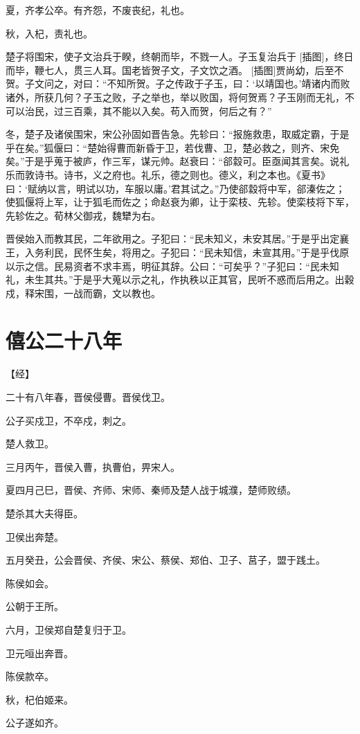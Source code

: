 \documentclass[a4paper,12pt,UTF8,twoside]{ctexbook}
\begin{document}
夏，齐孝公卒。有齐怨，不废丧纪，礼也。

秋，入杞，责礼也。

楚子将围宋，使子文治兵于睽，终朝而毕，不戮一人。子玉复治兵于 [插图]，终日而毕，鞭七人，贯三人耳。国老皆贺子文，子文饮之酒。 [插图]贾尚幼，后至不贺。子文问之，对曰：“不知所贺。子之传政于子玉，曰：‘以靖国也。’靖诸内而败诸外，所获几何？子玉之败，子之举也，举以败国，将何贺焉？子玉刚而无礼，不可以治民，过三百乘，其不能以入矣。苟入而贺，何后之有？”

冬，楚子及诸侯围宋，宋公孙固如晋告急。先轸曰：“报施救患，取威定霸，于是乎在矣。”狐偃曰：“楚始得曹而新昏于卫，若伐曹、卫，楚必救之，则齐、宋免矣。”于是乎蒐于被庐，作三军，谋元帅。赵衰曰：“郤縠可。臣亟闻其言矣。说礼乐而敦诗书。诗书，义之府也。礼乐，德之则也。德义，利之本也。《夏书》曰：‘赋纳以言，明试以功，车服以庸。’君其试之。”乃使郤縠将中军，郤溱佐之；使狐偃将上军，让于狐毛而佐之；命赵衰为卿，让于栾枝、先轸。使栾枝将下军，先轸佐之。荀林父御戎，魏犫为右。

晋侯始入而教其民，二年欲用之。子犯曰：“民未知义，未安其居。”于是乎出定襄王，入务利民，民怀生矣，将用之。子犯曰：“民未知信，未宣其用。”于是乎伐原以示之信。民易资者不求丰焉，明征其辞。公曰：“可矣乎？”子犯曰：“民未知礼，未生其共。”于是乎大蒐以示之礼，作执秩以正其官，民听不惑而后用之。出穀戍，释宋围，一战而霸，文以教也。

\section{僖公二十八年}


【经】

二十有八年春，晋侯侵曹。晋侯伐卫。

公子买戍卫，不卒戍，刺之。

楚人救卫。

三月丙午，晋侯入曹，执曹伯，畀宋人。

夏四月己巳，晋侯、齐师、宋师、秦师及楚人战于城濮，楚师败绩。

楚杀其大夫得臣。

卫侯出奔楚。

五月癸丑，公会晋侯、齐侯、宋公、蔡侯、郑伯、卫子、莒子，盟于践土。

陈侯如会。

公朝于王所。

六月，卫侯郑自楚复归于卫。

卫元咺出奔晋。

陈侯款卒。

秋，杞伯姬来。

公子遂如齐。
\end{document}
